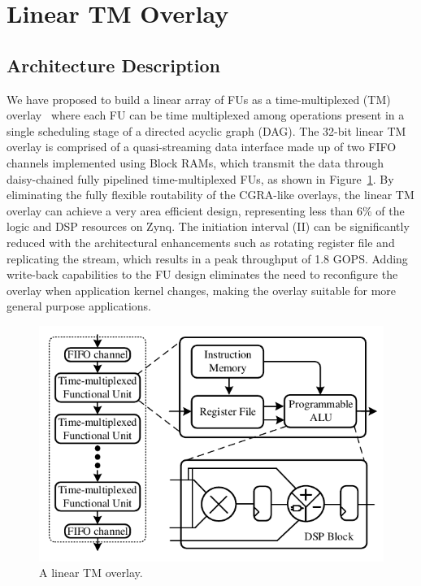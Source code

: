 \section{Linear TM Overlay}

\subsection{Architecture Description}
We have proposed to build a linear array of FUs as a time-multiplexed (TM) overlay~\cite{li2018time} where each FU can be time multiplexed among operations present in a single scheduling stage of a directed acyclic graph (DAG). 
The 32-bit linear TM overlay is comprised of a quasi-streaming data interface made up of two FIFO channels implemented using Block RAMs, which transmit the data through daisy-chained fully pipelined time-multiplexed FUs, as shown in Figure~\ref{overlay}. 
By eliminating the fully flexible routability of the CGRA-like overlays, the linear TM overlay can achieve a very area efficient design, representing less than 6\% of the logic and DSP resources on Zynq. 
The initiation interval (II) can be significantly reduced with the architectural enhancements such as rotating register file and replicating the stream, which results in a peak throughput of 1.8 GOPS. 
Adding write-back capabilities to the FU design eliminates the need to reconfigure the overlay when application kernel changes, making the overlay suitable for more general purpose applications. 


\begin{figure}
    \centering
	\includegraphics[width=\columnwidth]{Figures/overlay.pdf}
	\caption{A linear TM overlay.}
	\label{overlay}
\end{figure}


